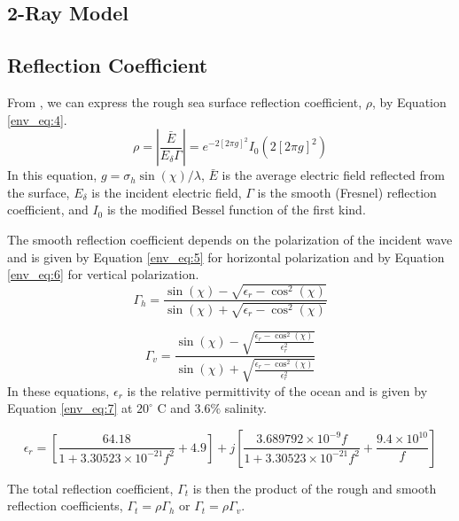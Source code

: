 \subsection{2-Ray Model}
\subsection{Reflection Coefficient}
From \cite{miller_reflection}, we can express the rough sea surface reflection coefficient, $\rho$, by Equation \ref{env_eq:4}. 
  \begin{equation}
  \label{env_eq:4}
\rho = \left|\frac{\bar{E}}{E_\delta \Gamma} \right| = e^{-2\left[2\pi g \right]^2}I_0\left( 2\left[2\pi g \right]^2\right) 
\end{equation}
In this equation, $g = \sigma_h\sin(\chi)/\lambda$, $\bar{E}$ is the average electric field reflected from the surface, $E_\delta$ is the incident electric field, $\Gamma$ is the smooth (Fresnel) reflection coefficient, and $I_0$ is the modified Bessel function of the first kind.

The smooth reflection coefficient depends on the polarization of the incident wave and is given by Equation \ref{env_eq:5} for horizontal polarization and by Equation \ref{env_eq:6} for vertical polarization.
  \begin{equation}
  \label{env_eq:5}
 \Gamma_h = \frac{\sin(\chi)- \sqrt{\epsilon_r - \cos^2(\chi)}}{\sin(\chi) + \sqrt{\epsilon_r - \cos^2(\chi)}}
  \end{equation}
  
  \begin{equation}
  \label{env_eq:6}
 \Gamma_v = \frac{\sin(\chi)- \sqrt{\frac{\epsilon_r - \cos^2(\chi)}{\epsilon_r^2}}}{\sin(\chi) + \sqrt{\frac{\epsilon_r - \cos^2(\chi)}{\epsilon_r^2}}}
  \end{equation}
In these equations, $\epsilon_r$ is the relative permittivity of the ocean and is given by Equation \ref{env_eq:7} at $20^{\circ}$ C and $3.6\%$ salinity. 
  
\begin{equation}
  \label{env_eq:7}
\epsilon_r = \left[\frac{64.18}{1 + 3.30523\times 10^{-21}f^2} + 4.9 \right] + j\left[\frac{3.689792\times 10^{-9}f}{1 + 3.30523\times 10^{-21}f^2} + \frac{9.4\times 10^{10}}{f} \right]
  \end{equation}
  
The total reflection coefficient, $\Gamma_t$ is then the product of the rough and smooth reflection coefficients, $\Gamma_t = \rho\Gamma_h$ or $\Gamma_t = \rho\Gamma_v$.

